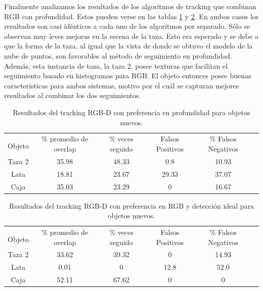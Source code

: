 Finalmente analizamos los resultados de los algoritmos de tracking que combinan RGB con profundidad. Estos pueden verse en las tablas \ref{tabla_rgbd_d_nuevos} y \ref{tabla_rgbd_rgb_nuevos}. En ambos casos los resultados son casi idénticos a cada uno de los algoritmos por separado. Sólo se observan muy leves mejoras en la escena de la taza. Esto era esperado y se debe a que la forma de la taza, al igual que la vista de donde se obtuvo el modelo de la nube de puntos, son favorables al método de seguimiento en profundidad. Además, esta instancia de taza, la taza 2, posee texturas que facilitan el seguimiento basado en histogramas para RGB. El objeto entonces posee buenas características para ambos sistemas, motivo por el cuál se capturan mejores resultados al combinar los dos seguimientos.

\begin{table}[h]
	\centering
    \begin{tabular}{|c|c|c|c|c|c|}
    \hline
    & \multirow{2}{2.4cm}{\% promedio de overlap} & \multirow{2}{2cm}{\% veces seguido} & \multirow{2}{1.6cm}{Falsos Positivos} & \multirow{2}{1.6cm}{\% Falsos Negativos}\\
	Objeto & & & &\\
    \hline
    Taza 2  & 35.98      & 48.33      & 0.8     & 10.93 \\
    \hline
    Lata    & 18.81      & 23.67      & 29.33   & 37.07 \\
    \hline
    Caja    & 35.03      & 23.29      & 0       & 16.67 \\
    \hline
    \end{tabular}
\caption{Resultados del tracking RGB-D con preferencia en profundidad para objetos nuevos.}
\label{tabla_rgbd_d_nuevos}
\end{table}

\begin{table}[h]
	\centering
    \begin{tabular}{|c|c|c|c|c|c|}
    \hline
    & \multirow{2}{2.4cm}{\% promedio de overlap} & \multirow{2}{2cm}{\% veces seguido} & \multirow{2}{1.6cm}{Falsos Positivos} & \multirow{2}{1.6cm}{\% Falsos Negativos}\\
	Objeto & & & &\\
    \hline
    Taza 2  & 33.62      & 39.32      & 0       & 14.93\\
    \hline
    Lata    &  0.01      &     0      & 12.8    &  52.0\\
    \hline
    Caja    & 52.11      & 67.62      & 0       &     0\\
    \hline
    \end{tabular}
\caption{Resultados del tracking RGB-D con preferencia en RGB y detección ideal para objetos nuevos.}
\label{tabla_rgbd_rgb_nuevos}
\end{table}


